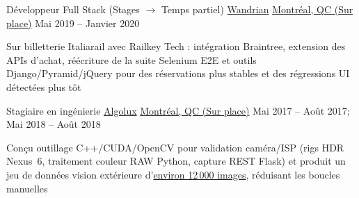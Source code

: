 \begin{cventries}
\cventry
{Développeur Full Stack (Stages $\rightarrow$ Temps partiel)} %
{\href{https://www.wandrian.com/}{Wandrian}} %
{\href{https://www.google.com/maps/search/?api=1\&query=Montreal,+QC,+Canada}{Montréal, QC (Sur place)}} %
{Mai 2019 -- Janvier 2020} %
{
\begin{cvitems}
\item {Sur billetterie Italiarail avec Railkey Tech : intégration Braintree, extension des APIs d'achat, réécriture de la suite Selenium E2E et outils Django/Pyramid/jQuery pour des réservations plus stables et des régressions UI détectées plus tôt}
\end{cvitems}
}

\cventry
{Stagiaire en ingénierie} %
{\href{https://torc.ai/}{Algolux}} %
{\href{https://www.google.com/maps/search/?api=1\&query=Montreal,+QC,+Canada}{Montréal, QC (Sur place)}} %
{Mai 2017 -- Août 2017; Mai 2018 -- Août 2018} %
{
\begin{cvitems}
\item {Conçu outillage C++/CUDA/OpenCV pour validation caméra/ISP (rigs HDR Nexus~6, traitement couleur RAW Python, capture REST Flask) et produit un jeu de données vision extérieure d'\uline{environ 12\,000 images}, réduisant les boucles manuelles}
\end{cvitems}
}

\end{cventries}
